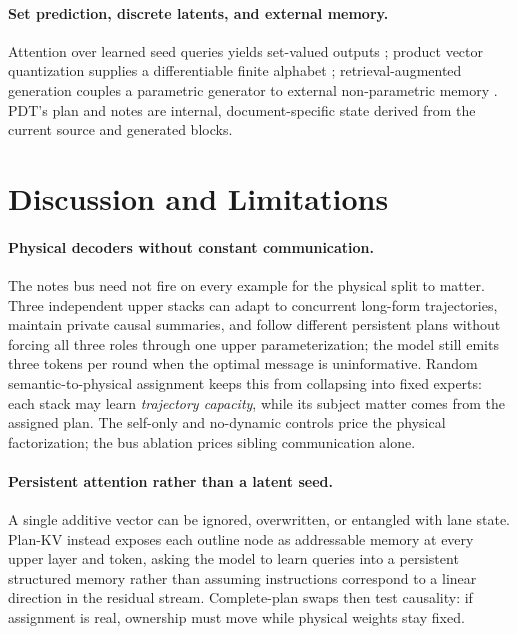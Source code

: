 \documentclass[10pt]{article}
\newcommand{\pdt}{\textsc{PDT}}
\begin{document}
\paragraph{Set prediction, discrete latents, and external memory.}
Attention over learned seed queries yields set-valued outputs
\citep{lee2019settransformer}; product vector quantization supplies a
differentiable finite alphabet \citep{vandenOord2017vq};
retrieval-augmented generation couples a parametric generator to external
non-parametric memory \citep{lewis2020rag}. \pdt's plan and notes are
internal, document-specific state derived from the current source and
generated blocks.

\section{Discussion and Limitations}
\label{sec:discussion}

\paragraph{Physical decoders without constant communication.}
The notes bus need not fire on every example for the physical split to
matter. Three independent upper stacks can adapt to concurrent long-form
trajectories, maintain private causal summaries, and follow different
persistent plans without forcing all three roles through one upper
parameterization; the model still emits three tokens per round when the
optimal message is uninformative. Random semantic-to-physical assignment
keeps this from collapsing into fixed experts: each stack may learn
\emph{trajectory capacity}, while its subject matter comes from the assigned
plan. The self-only and no-dynamic controls price the physical
factorization; the bus ablation prices sibling communication alone.

\paragraph{Persistent attention rather than a latent seed.}
A single additive vector can be ignored, overwritten, or entangled with lane
state. Plan-KV instead exposes each outline node as addressable memory at
every upper layer and token, asking the model to learn queries into a
persistent structured memory rather than assuming instructions correspond to
a linear direction in the residual stream. Complete-plan swaps then test
causality: if assignment is real, ownership must move while physical weights
stay fixed.
\end{document}

